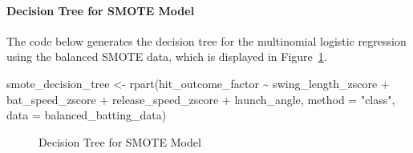 \documentclass[
  letterpaper,
  DIV=11,
  numbers=noendperiod]{scrartcl}
\let\oldparagraph\paragraph
\renewcommand{\paragraph}[1]{\oldparagraph{#1}\mbox{}}
\newenvironment{Shaded}{\begin{snugshade}}{\end{snugshade}}
\newcommand{\AttributeTok}[1]{\textcolor[rgb]{0.40,0.45,0.13}{#1}}
\newcommand{\FunctionTok}[1]{\textcolor[rgb]{0.28,0.35,0.67}{#1}}
\newcommand{\NormalTok}[1]{\textcolor[rgb]{0.00,0.23,0.31}{#1}}
\newcommand{\OtherTok}[1]{\textcolor[rgb]{0.00,0.23,0.31}{#1}}
\newcommand{\SpecialCharTok}[1]{\textcolor[rgb]{0.37,0.37,0.37}{#1}}
\newcommand{\StringTok}[1]{\textcolor[rgb]{0.13,0.47,0.30}{#1}}
\begin{document}
\paragraph{Decision Tree for SMOTE
Model}\label{decision-tree-for-smote-model}

The code below generates the decision tree for the multinomial logistic
regression using the balanced SMOTE data, which is displayed in
Figure~\ref{fig-dec-tree-smote}.

\begin{Shaded}
\begin{Highlighting}[]
\NormalTok{smote\_decision\_tree }\OtherTok{\textless{}{-}} \FunctionTok{rpart}\NormalTok{(hit\_outcome\_factor }\SpecialCharTok{\textasciitilde{}}
\NormalTok{                               swing\_length\_zscore }\SpecialCharTok{+}
\NormalTok{                               bat\_speed\_zscore }\SpecialCharTok{+}
\NormalTok{                               release\_speed\_zscore }\SpecialCharTok{+}
\NormalTok{                               launch\_angle,}
                             \AttributeTok{method =} \StringTok{"class"}\NormalTok{,}
                             \AttributeTok{data =}\NormalTok{ balanced\_batting\_data)}
\end{Highlighting}
\end{Shaded}

\begin{figure}[H]


\caption{\label{fig-dec-tree-smote}Decision Tree for SMOTE Model}

\end{figure}%
\end{document}
